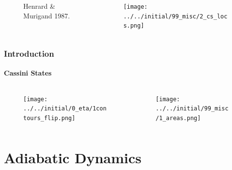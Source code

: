 \documentclass[dvipsnames]{beamer}
\begin{document}
\begin{frame}
\begin{columns}
\begin{column}{0.5\textwidth}
\begin{figure}
\begin{subfigure}{0.3\textwidth}
                \end{subfigure}
                \caption{Henrard \& Murigand 1987.}
            \end{figure}
        \end{column}
        \begin{column}{0.5\textwidth}
            \begin{figure}
                \centering
                \texttt{[image: ../../initial/99\_misc/2\_cs\_locs.png]}
            \end{figure}
        \end{column}
    \end{columns}
\end{frame}

\begin{frame}
    \frametitle{Introduction}
    \framesubtitle{Cassini States}

    \begin{columns}
        \begin{column}{0.5\textwidth}
            \begin{figure}
                \centering
                \texttt{[image: ../../initial/0\_eta/1contours\_flip.png]}
            \end{figure}
        \end{column}
        \begin{column}{0.5\textwidth}
            \begin{figure}
                \centering
                \texttt{[image: ../../initial/99\_misc/1\_areas.png]}
            \end{figure}
        \end{column}
    \end{columns}
\end{frame}

\section{Adiabatic Dynamics}
\end{document}
